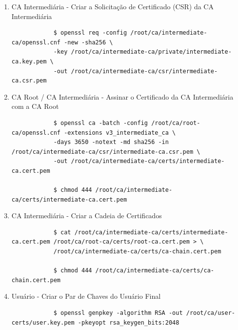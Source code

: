 \begin{enumerate}
\begin{tcolorbox}[width=\textwidth]
{\begin{verbatim}
			$ chmod 400 /root/ca/intermediate-ca/private/intermediate-ca.key.pem
		\end{verbatim}
	}
	\end{tcolorbox}

	\item CA Intermediária - Criar a Solicitação de Certificado (CSR) da CA Intermediária
	\begin{tcolorbox}[width=\textwidth]
	{\footnotesize
		\begin{verbatim}
			$ openssl req -config /root/ca/intermediate-ca/openssl.cnf -new -sha256 \
			-key /root/ca/intermediate-ca/private/intermediate-ca.key.pem \
			-out /root/ca/intermediate-ca/csr/intermediate-ca.csr.pem
		\end{verbatim}
	}
	\end{tcolorbox}

	\item CA Root / CA Intermediária - Assinar o Certificado da CA Intermediária com a CA Root
	\begin{tcolorbox}[width=\textwidth]
	{\footnotesize
		\begin{verbatim}
			$ openssl ca -batch -config /root/ca/root-ca/openssl.cnf -extensions v3_intermediate_ca \
			-days 3650 -notext -md sha256 -in /root/ca/intermediate-ca/csr/intermediate-ca.csr.pem \
			-out /root/ca/intermediate-ca/certs/intermediate-ca.cert.pem

			$ chmod 444 /root/ca/intermediate-ca/certs/intermediate-ca.cert.pem
		\end{verbatim}
	}
	\end{tcolorbox}

	\item CA Intermediária - Criar a Cadeia de Certificados
	\begin{tcolorbox}[width=\textwidth]
	{\footnotesize
		\begin{verbatim}
			$ cat /root/ca/intermediate-ca/certs/intermediate-ca.cert.pem /root/ca/root-ca/certs/root-ca.cert.pem > \
			/root/ca/intermediate-ca/certs/ca-chain.cert.pem

			$ chmod 444 /root/ca/intermediate-ca/certs/ca-chain.cert.pem
		\end{verbatim}
	}
	\end{tcolorbox}

	\item Usuário - Criar o Par de Chaves do Usuário Final
	\begin{tcolorbox}[width=\textwidth]
	{\footnotesize
		\begin{verbatim}
			$ openssl genpkey -algorithm RSA -out /root/ca/user-certs/user.key.pem -pkeyopt rsa_keygen_bits:2048


\end{verbatim}}
\end{tcolorbox}
\end{enumerate}
